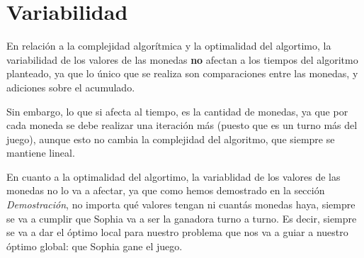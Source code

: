 \section{Variabilidad}

 En relación a la complejidad algorítmica y la optimalidad del algortimo, la variabilidad de los valores de las monedas \textbf{no} afectan a los tiempos del algoritmo planteado, ya que lo único que se realiza son comparaciones entre las monedas, y adiciones sobre el acumulado.

 Sin embargo, lo que si afecta al tiempo, es la cantidad de monedas, ya que por cada moneda se debe realizar una iteración más (puesto que es un turno más del juego), aunque esto no cambia la complejidad del algoritmo, que siempre se mantiene lineal.
 
 En cuanto a la optimalidad del algortimo, la variablidad de los valores de las monedas no lo va a afectar, ya que como hemos demostrado en la sección \textit{Demostración}, no importa qué valores tengan ni cuantás monedas haya, siempre se va a cumplir que Sophia va a ser la ganadora turno a turno. Es decir, siempre se va a dar el óptimo local para nuestro problema que nos va a guiar a nuestro óptimo global: que Sophia gane el juego.





